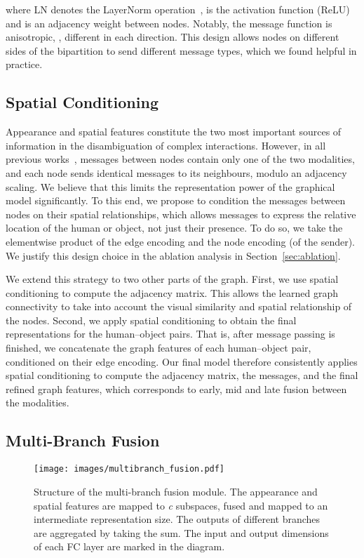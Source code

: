 \documentclass[10pt,twocolumn,letterpaper]{article}
\begin{document}
where LN denotes the LayerNorm operation~\cite{ba2016},  is the activation function (ReLU) and  is an adjacency weight between nodes. Notably, the message function  is anisotropic, \ie, different in each direction. This design allows nodes on different sides of the bipartition to send different message types, which we found helpful in practice.

\subsection{Spatial Conditioning}

Appearance and spatial features constitute the two most important sources of information in the disambiguation of complex interactions. However, in all previous works~\cite{qi2018,wang2020,gao2020,ulutan2020}, messages between nodes contain only one of the two modalities, and each node sends identical messages to its neighbours, modulo an adjacency scaling. We believe that this limits the representation power of the graphical model significantly. To this end, we propose to condition the messages between nodes on their spatial relationships, which allows messages to express the relative location of the human or object, not just their presence. To do so, we take the elementwise product of the edge encoding and the node encoding (of the sender). We justify this design choice in the ablation analysis in Section~\ref{sec:ablation}.

We extend this strategy to two other parts of the graph. First, we use spatial conditioning to compute the adjacency matrix. This allows the learned graph connectivity to take into account the visual similarity and spatial relationship of the nodes. Second, we apply spatial conditioning to obtain the final representations for the human--object pairs. That is, after message passing is finished, we concatenate the graph features of each human--object pair, conditioned on their edge encoding.
Our final model therefore consistently applies spatial conditioning to compute the adjacency matrix, the messages, and the final refined graph features, which corresponds to early, mid and late fusion between the modalities.

\subsection{Multi-Branch Fusion}

\begin{figure}[t]\centering
	\texttt{[image: images/multibranch\_fusion.pdf]}
	\caption{Structure of the multi-branch fusion module. The appearance and spatial features are mapped to \textit{c} subspaces, fused and mapped to an intermediate representation size. The outputs of different branches are aggregated by taking the sum. The input and output dimensions of each FC layer are marked in the diagram.}
	\label{fig:mbf}
\end{figure}
\end{document}
